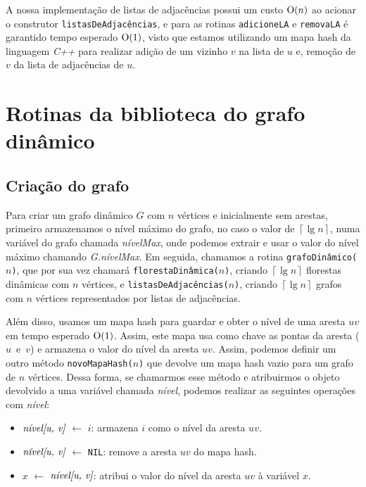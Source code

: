 A nossa implementação \cite{chung2025} de listas de adjacências possui um custo $\mathrm{O}(n)$ ao acionar o construtor \texttt{listasDeAdjacências}, e para 
as rotinas \texttt{adicioneLA} e \texttt{removaLA} é garantido tempo esperado $\mathrm{O}(1)$, visto que estamos utilizando um mapa hash da linguagem \textit{C++} para realizar adição de um vizinho $v$ na lista de $u$ e, remoção de $v$ da lista de adjacências de $u$.

\section{Rotinas da biblioteca do grafo dinâmico}
\label{sec:dynamic-graph-routines}

\subsection{Criação do grafo}
\label{sec:dynamic-graph-creation}

Para criar um grafo dinâmico $G$ com $n$ vértices e inicialmente sem arestas, primeiro armazenamos o nível máximo do grafo, no caso o valor de $\left\lceil \lg n \right\rceil$, numa variável do grafo chamada \textit{nívelMax}, onde podemos extrair e usar o valor do nível máximo chamando \textit{G.nívelMax}. Em seguida, chamamos a rotina \texttt{grafoDinâmico($n$)}, que por sua vez chamará \texttt{florestaDinâmica($n$)}, criando $\left\lceil \lg n \right\rceil$ florestas dinâmicas com $n$ vértices, e \texttt{listasDeAdjacências($n$)}, criando $\left\lceil \lg n \right\rceil$ grafos com $n$ vértices representados por listas de adjacências. 

Além disso, usamos um mapa hash para guardar e obter o nível de uma aresta $uv$ em tempo esperado $\mathrm{O}(1)$. Assim, este mapa usa como chave as pontas da aresta ($u$~e~$v$) e armazena o valor do nível da aresta $uv$. Assim, podemos definir um outro método \texttt{novoMapaHash($n$)} que devolve um mapa hash vazio para um grafo de $n$ vértices. Dessa forma, se chamarmos esse método e atribuirmos o objeto devolvido a uma variável chamada \textit{nível}, podemos realizar as seguintes operações com \textit{nível}:

\begin{itemize}
    \item $\emph{nível[u, v]}$ $\leftarrow$ $i$: armazena $i$ como o nível da aresta $uv$.
    
    \item $\emph{nível[u, v]}$ $\leftarrow$ \texttt{NIL}: remove a aresta $uv$ do mapa hash.
    
    \item $x$ $\leftarrow$ $\emph{nível[u, v]}$: atribui o valor do nível da aresta $uv$ à variável $x$. 
\end{itemize}

